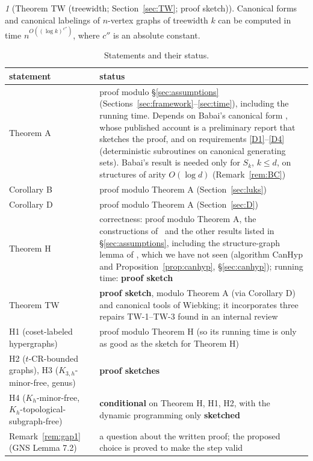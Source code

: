 \documentclass[11pt]{article}
\theoremstyle{plain}
\theoremstyle{definition}
\theoremstyle{remark}
\theoremstyle{named}
\newtheorem*{named}{}
\theoremstyle{namedrm}
\begin{document}
\begin{named}[Theorem TW (treewidth; Section~\ref{sec:TW}; proof sketch)]
Canonical forms and canonical labelings of $n$-vertex graphs of treewidth $k$ can be computed in time
$n^{O((\log k)^{c''})}$, where $c''$ is an absolute constant.
\end{named}

\begin{table}[ht]
\centering\small
\begin{tabularx}{\linewidth}{@{}L{4.6cm}Y@{}}
\toprule
statement & status\\
\midrule
Theorem A & proof modulo \S\ref{sec:assumptions} (Sections~\ref{sec:framework}--\ref{sec:time}), including the running time. Depends on Babai's canonical form \cite[Thm.~2.2]{Bab19}, whose published account is a preliminary report that sketches the proof, and on requirements \ref{D1}--\ref{D4} (deterministic subroutines on canonical generating sets). Babai's result is needed only for $S_k$, $k\le d$, on structures of arity $O(\log d)$ (Remark~\ref{rem:BC})\\
Corollary B & proof modulo Theorem A (Section~\ref{sec:luks})\\
Corollary D & proof modulo Theorem A (Section~\ref{sec:D})\\
Theorem H & correctness: proof modulo Theorem A, the constructions of~\cite{Neu20} and the other results listed in \S\ref{sec:assumptions}, including the structure-graph lemma of \cite{Neu19}, which we have not seen (algorithm CanHyp and Proposition~\ref{prop:canhyp}, \S\ref{sec:canhyp}); running time: \textbf{proof sketch}\\
Theorem TW & \textbf{proof sketch}, modulo Theorem A (via Corollary D) and canonical tools of Wiebking; it incorporates three repairs TW-1--TW-3 found in an internal review\\
H1 (coset-labeled hypergraphs) & proof modulo Theorem H (so its running time is only as good as the sketch for Theorem H)\\
H2 ($t$-CR-bounded graphs), H3 ($K_{3,h}$-minor-free, genus) & \textbf{proof sketches}\\
H4 ($K_h$-minor-free, $K_h$-topological-subgraph-free) & \textbf{conditional} on Theorem H, H1, H2, with the dynamic programming only \textbf{sketched}\\
Remark~\ref{rem:gap1} (GNS Lemma 7.2) & a question about the written proof; the proposed choice is proved to make the step valid\\
\bottomrule
\end{tabularx}
\caption{Statements and their status.}\label{tab:status}
\end{table}
\end{document}
